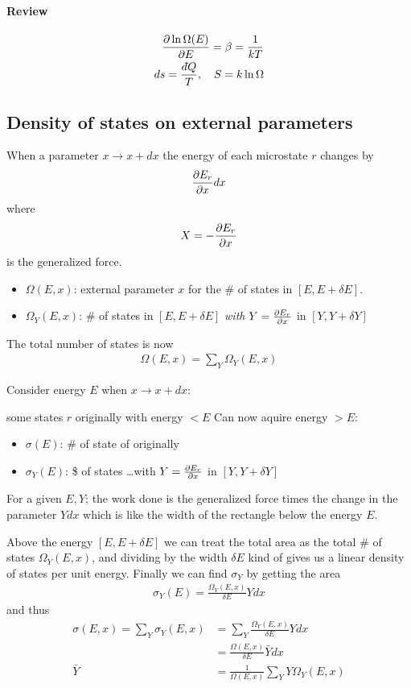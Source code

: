\documentclass[../main.tex]{subfiles}
\begin{document}
\newpage
{}
\paragraph{Review}
\begin{align*}
    \pdv{\ln\Omega(E)}{E} = \beta = \frac{1}{kT} \\
    ds = \frac{d\hspace*{-0.08em}\bar{}\hspace*{0.1em} Q}{T}, \quad S = k \ln \Omega
\end{align*}

\subsection{Density of states on external parameters}
When a parameter $x \to x + dx$ the energy of each microstate $r$ changes by 
\begin{align*}
    \pdv{E_r}{x} dx
\end{align*}
where 
\begin{align*}
    X = -\pdv{E_r}{x}
\end{align*}
is the generalized force.

\begin{itemize}
    \item \( \Omega(E,x) \): external parameter $x$ for the \# of states in $[E, E + \delta E]$.
    \item \( \Omega_Y(E,x) \): \# of states in $[E, E + \delta E]$ \textit{with} $Y = \pdv{E_r}{x}$ in $[Y, Y + \delta Y]$
\end{itemize}
The total number of states is now
\begin{align*}
    \Omega(E,x) = \sum_Y \Omega_Y(E,x)
\end{align*}

Consider energy $E$ when $x \to x + dx$:

some states $r$ originally with energy $<E$ Can now aquire energy $>E$:
\begin{itemize}
    \item $\sigma(E)$: \# of state of originally
    \item $\sigma_Y(E)$: \$ of states \dots with $Y = \pdv{E_r}{x}$ in $[Y, Y + \delta Y]$
\end{itemize}

For a given $E, Y$; the work done is the generalized force times the change in the parameter $Y dx$ which is like the width of the rectangle below the energy $E$.

Above the energy $[E, E + \delta E]$ we can treat the total area as the total \# of states $\Omega_Y(E,x)$,
and dividing by the width $\delta E$ kind of gives us a linear density of states per unit energy.
Finally we can find $\sigma_Y$ by getting the area
\begin{align*}
    \sigma_Y(E) = \frac{\Omega_Y(E,x)}{\delta E} Y dx
\end{align*}
and thus
\begin{align*}
    \sigma (E,x) = \sum_Y \sigma_Y(E,x) &= \sum_Y \frac{\Omega_Y(E,x)}{\delta E} Y dx \\
    &= \frac{\Omega(E,x)}{\delta E} \bar Y dx \\
    \bar Y &= \frac{1}{\Omega(E,x)} \sum_Y Y \Omega_Y(E,x)
\end{align*}
\end{document}
